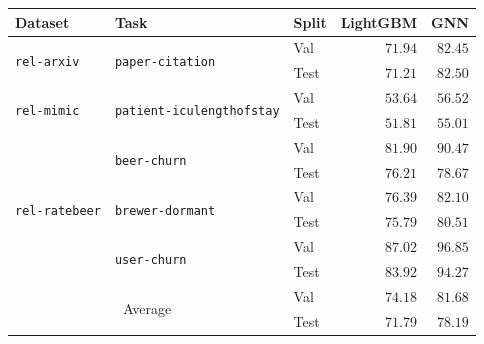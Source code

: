 \begin{tabular}{lllrr}
\toprule
Dataset & Task & Split & LightGBM & GNN \\
\midrule
\multirow[c]{2}{*}{\texttt{rel-arxiv}} & \multirow[c]{2}{*}{\texttt{paper-citation}} & Val & $71.94$ & $\bm{82.45}$ \\
 &  & Test & $71.21$ & $\bm{82.50}$ \\
\cmidrule{1-5} \cmidrule{2-5}
\multirow[c]{2}{*}{\texttt{rel-mimic}} & \multirow[c]{2}{*}{\texttt{patient-iculengthofstay}} & Val & $53.64$ & $\bm{56.52}$ \\
 &  & Test & $51.81$ & $\bm{55.01}$ \\
\cmidrule{1-5} \cmidrule{2-5}
\multirow[c]{6}{*}{\texttt{rel-ratebeer}} & \multirow[c]{2}{*}{\texttt{beer-churn}} & Val & $81.90$ & $\bm{90.47}$ \\
 &  & Test & $76.21$ & $\bm{78.67}$ \\
\cmidrule{2-5}
 & \multirow[c]{2}{*}{\texttt{brewer-dormant}} & Val & $76.39$ & $\bm{82.10}$ \\
 &  & Test & $75.79$ & $\bm{80.51}$ \\
\cmidrule{2-5}
 & \multirow[c]{2}{*}{\texttt{user-churn}} & Val & $87.02$ & $\bm{96.85}$ \\
 &  & Test & $83.92$ & $\bm{94.27}$ \\
\cmidrule{1-5} \cmidrule{2-5}
\multicolumn{2}{c}{\multirow{2}{*}{Average}} & Val & $74.18$ & $\bm{81.68}$ \\
 &  & Test & $71.79$ & $\bm{78.19}$ \\
\bottomrule
\end{tabular}
